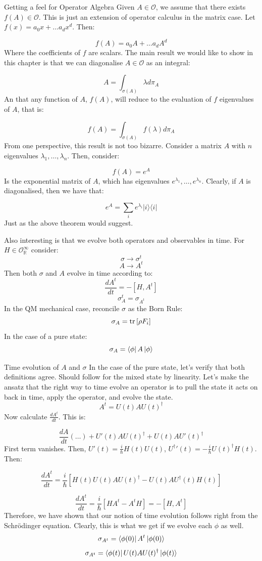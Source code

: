 \documentclass{amsart}
\begin{document}
\begin{example}{Getting a feel for Operator Algebra}
Given $A \in \mathcal{O}$, we assume that there exists $f(A) \in \mathcal{O}$. This is just an extension of operator calculus in the matrix case. Let $f(x) = a_{0} x + \dots a_{d} x^{d}$. Then:

$$f(A) = a_{0} A + \dots a_{d} A^{d}$$
Where the coefficients of $f$ are scalars. The main result we would like to show in this chapter is that we can diagonalise $A \in \mathcal{O}$ as an integral:

$$A = \int_{\sigma(A)} \lambda d \pi_{A}$$
An that any function of $A$, $f(A)$, will reduce to the evaluation of $f$ eigenvalues of $A$, that is:

$$f(A) = \int_{\sigma(A)} f(\lambda) d \pi_{A}$$
From one perspective, this result is not too bizarre. Consider a matrix $A$ with $n$ eigenvalues $\lambda_{1}, \dots, \lambda_{n}$. Then, consider:

$$f(A) = e^{A}$$
Is the exponential matrix of $A$, which has eigenvalues $e^{\lambda_{1}}, \dots, e^{\lambda_{n}}$. Clearly, if $A$ is diagonalised, then we have that:

$$e^{A} = \sum_{i} e^{\lambda_{i}} \vert i \rangle \langle i \vert$$
Just as the above theorem would suggest. 
\end{example} 

Also interesting is that we evolve both operators and observables in time. For $H \in \mathcal{O}^{\infty}_{\mathbb{R}}$ consider:
$$\sigma \to \sigma^{t}$$
$$A \to A^{t}$$
Then both $\sigma$ and $A$ evolve in time according to:
$$\frac{d A^{t}}{dt} = - [H, A^{t}]$$
$$\sigma^{t}_{A} = \sigma_{A^{t}}$$
In the QM mechanical case, reconcile $\sigma$ as the Born Rule:
$$\sigma_{A} = \tr \left[ \rho F_{i} \right ]$$
In the case of a pure state:
$$\sigma_{A} = \bra{\phi} A \ket{ \phi}$$

\begin{example}{Time evolution of $A$ and $\sigma$}
In the case of the pure state, let's verify that both definitions agree. 
Should follow for the mixed state by linearity. Let's make the ansatz that the right way to time evolve an operator is to pull the state it acts on back in time, apply the operator, and evolve the state. 
$$A^{t} = U(t) A U(t)^{\dag}$$
Now calculate $\frac{d A^{t}}{dt}$. This is:

$$\frac{dA}{dt} (\dots) + U'(t) A U(t)^{\dag} + U(t) A U'(t)^{\dag} $$
First term vanishes. Then, $U'(t) = \frac{i}{\hbar} H(t) U(t)$, ${U^{\dag}}'(t) = -\frac{i}{\hbar} U(t)^{\dag} H(t)$. Then:

$$\frac{d A^{t}}{dt} = \frac{i}{\hbar} \left[ H(t) U(t) A U(t)^{\dag} - U(t) A U^{\dag}(t) H(t) \right]$$

$$\frac{d A^{t}}{dt} = \frac{i}{\hbar} \left[H A^{t} - A^{t} H \right] = -[H, A^{t}]$$
Therefore, we have shown that our notion of time evolution follows right from the Schrödinger equation. Clearly, this is what we get if we evolve each $\phi$ as well. 
$$\sigma_{A^{t}} = \bra{\phi(0)} A^{t} \ket{ \phi(0)}$$
$$\sigma_{A^{t}} = \bra{\phi(t)} U(t) A U(t)^{\dag} \ket{ \phi(t)}$$
\end{example}
\end{document}
